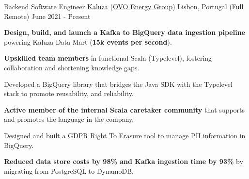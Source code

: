 
\begin{cventries}
  \vspace{-2mm}
  \cventry
    {Backend Software Engineer}
    {\href{https://www.kaluza.com/}{Kaluza} (\href{https://www.ovoenergy.com/}{OVO Energy Group})}
    {Lisbon, Portugal (Full Remote)}
    {June 2021 - Present}
    {
      \begin{cvitems}
        \item \textbf{Design, build, and launch a Kafka to BigQuery data ingestion pipeline} powering Kaluza Data Mart (\textbf{15k events per second}).
        \item \textbf{Upskilled team members} in functional Scala (Typelevel), fostering collaboration and shortening knowledge gaps.
        \item Developed a BigQuery library that bridges the Java SDK with the Typelevel stack to promote reusability, and reliability. 
        \item \textbf{Active member of the internal Scala caretaker community} that supports and promotes the language in the company.
        \item Designed and built a GDPR Right To Erasure tool to manage PII information in BigQuery.
        \item \textbf{Reduced data store costs by 98\% and Kafka ingestion time by 93\%} by migrating from PostgreSQL to DynamoDB.  %
      \end{cvitems}
      \vspace{4mm}
    }



\end{cventries}
